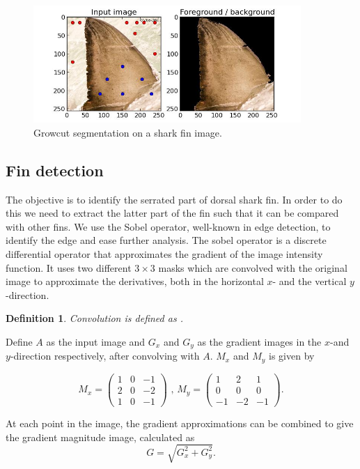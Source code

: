 \documentclass[a4paper,10pt]{article}
\newtheorem{mydef}{Definition}
\begin{document}
\begin{figure}[H]
 \centering
 \includegraphics[width=4in]{segmentation.jpg}
 \caption{Growcut segmentation on a shark fin image.}
 \label{segmentation}
\end{figure}

\subsection{Fin detection}
The objective is to identify the serrated part of dorsal shark fin. In order to do this we need to extract the latter part of the fin such that it can be
compared with other fins.  We use the Sobel operator, well-known in edge detection, to identify the edge and ease further analysis.  
The sobel operator is a discrete differential operator that approximates the gradient of the image intensity function.
It uses two different $3 \times 3$ masks which are convolved with the original image to approximate the derivatives, both in the horizontal $x$-
and the vertical $y$-direction.  

\begin{mydef}
Convolution is defined as .


\end{mydef}

Define $A$ as the input image and $G_x$ and $G_y$ as the gradient images in the $x$-and $y$-direction respectively,
after convolving with $A$.  $M_x$ and $M_y$ is given by

\[
 M_x = \begin{pmatrix*}
        1 & 0 & -1 \\
        2 & 0 & -2 \\
        1 & 0 & -1
       \end{pmatrix*}
\mbox{ , }
 M_y = \begin{pmatrix*}
        1 & 2 & 1 \\
        0 & 0 & 0 \\
        -1 & -2 & -1
       \end{pmatrix*}
.\]

At each point in the image, the gradient approximations can be combined to give the gradient magnitude image, calculated  as
\[
 G = \sqrt{G_x^2+G_y^2}
.\]
\end{document}
